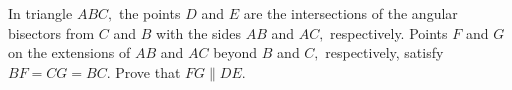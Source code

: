 In triangle $ABC,$ the points $D$ and $E$ are the intersections of the angular bisectors from $C$ and $B$ with the sides $AB$ and $AC,$ respectively. Points $F$ and $G$ on the extensions of $AB$ and $AC$ beyond $B$ and $C,$ respectively, satisfy $BF = CG = BC.$ Prove that $F G \parallel DE.$